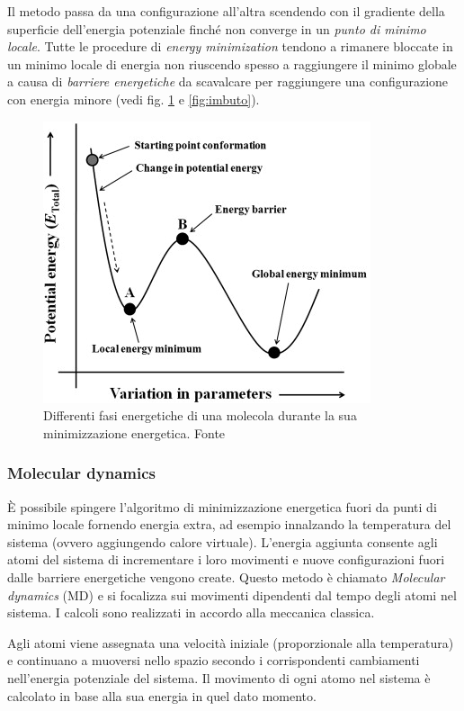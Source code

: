 {Il metodo passa da una configurazione all'altra scendendo con il gradiente della superficie dell'energia potenziale finché non converge in un \textit{punto di minimo locale}. Tutte le procedure di \textit{energy minimization }tendono a rimanere bloccate in un minimo locale di energia non riuscendo spesso a raggiungere il minimo globale a causa di \textit{barriere energetiche} da scavalcare per raggiungere una configurazione con energia minore (vedi fig. \ref{fig:energy-minimization} e \ref{fig:imbuto}).

\begin{figure}[!htb]
	\centering
	\includegraphics[scale=1]{images/energy-minimzation.jpg}
	\caption{Differenti fasi energetiche di una molecola durante la sua minimizzazione energetica. Fonte\cite{ROY2015151}}
	\label{fig:energy-minimization}
\end{figure}

\subsubsection{Molecular dynamics}

È possibile spingere l'algoritmo di minimizzazione energetica fuori da punti di minimo locale fornendo energia extra, ad esempio innalzando la temperatura del sistema (ovvero aggiungendo calore virtuale). L'energia aggiunta consente agli atomi del sistema di incrementare i loro movimenti e nuove configurazioni fuori dalle barriere energetiche vengono create. Questo metodo è chiamato \textit{Molecular dynamics} (MD) e si focalizza sui movimenti dipendenti dal tempo degli atomi nel sistema. I calcoli sono realizzati in accordo alla meccanica classica. 

\par Agli atomi viene assegnata una velocità iniziale (proporzionale alla temperatura) e continuano a muoversi nello spazio secondo i corrispondenti cambiamenti nell'energia potenziale del sistema. Il movimento di ogni atomo nel sistema è calcolato in base alla sua energia in quel dato momento.

}
